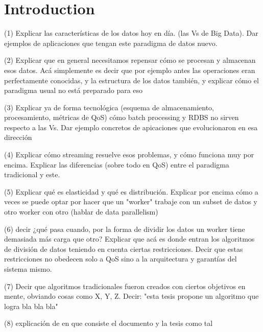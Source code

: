 \chapter{Introduction}
\label{chapter:introduction}

(1)
Explicar las características de los datos hoy en día. (las Vs de Big Data).
Dar ejemplos de aplicaciones que tengan este paradigma de datos nuevo.

(2)
Explicar que en general necesitamos repensar cómo se procesan y almacenan esos datos. Acá simplemente es decir que por ejemplo antes las operaciones eran perfectamente conocidas, y la estructura de los datos también, y explicar cómo el paradigma usual no está preparado para eso

(3)
Explicar ya de forma tecnológica (esquema de almacenamiento, procesamiento, métricas de QoS) cómo batch processing y RDBS no sirven respecto a las Vs. Dar ejemplo concretos de apicaciones que evolucionaron en esa dirección

(4)
Explicar cómo streaming resuelve esos problemas, y cómo funciona muy por encima. Explicar las diferencias (sobre todo en QoS) entre el paradigma tradicional y este.

(5)
Explicar qué es elasticidad y qué es distribución. Explicar por encima cómo a veces se puede optar por hacer que un "worker" trabaje con un subset de datos y otro worker con otro (hablar de data parallelism)

(6)
decir ¿qué pasa cuando, por la forma de dividir los datos un worker tiene demasiada más carga que otro? Explicar que acá es donde entran los algoritmos de división de datos teniendo en cuenta ciertas restricciones. Decir que estas restricciones no obedecen solo a QoS sino a la arquitectura y garantías del sistema mismo.

(7)
Decir que algoritmos tradicionales fueron creados con ciertos objetivos en mente, obviando cosas como X, Y, Z. Decir: "esta tesis propone un algoritmo que logra bla bla bla"

(8)
explicación de en que consiste el documento y la tesis como tal

